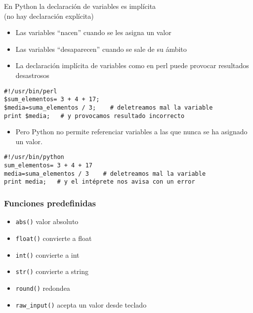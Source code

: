 \documentclass[ucs]{beamer}
\begin{document}
\begin{frame}[fragile]

En Python la declaración de variables es implícita \\(no hay declaración explícita)
\begin{itemize}
\item Las variables ``nacen'' cuando se les asigna un valor
\item Las variables ``desaparecen'' cuando se sale de su ámbito
\end{itemize}  
\begin{itemize}
  
\item 
La declaración implícita de variables como en perl puede provocar resultados desastrosos
\end{itemize}

\begin{scriptsize}
\begin{verbatim}
#!/usr/bin/perl
$sum_elementos= 3 + 4 + 17;
$media=suma_elementos / 3;    # deletreamos mal la variable
print $media;   # y provocamos resultado incorrecto
\end{verbatim}
\end{scriptsize}

\begin{itemize}
\item 
Pero Python no permite referenciar variables a las que nunca se ha
asignado un valor.
\end{itemize}
\begin{scriptsize}
\begin{verbatim}
#!/usr/bin/python 
sum_elementos= 3 + 4 + 17
media=suma_elementos / 3    # deletreamos mal la variable
print media;   # y el intéprete nos avisa con un error
\end{verbatim}
\end{scriptsize}



\end{frame}


\begin{frame}[fragile]
\frametitle{Funciones predefinidas}  
\begin{itemize}
  
\item 
\verb|abs()|   valor absoluto
\item 
\verb|float()|  convierte a float
\item 
\verb|int()|  convierte a int
\item 
\verb|str()|  convierte a string
\item 
\verb|round()|  redondea
\item 
\verb|raw_input()|  acepta un valor desde teclado


\end{itemize}
\end{frame}
\end{document}
